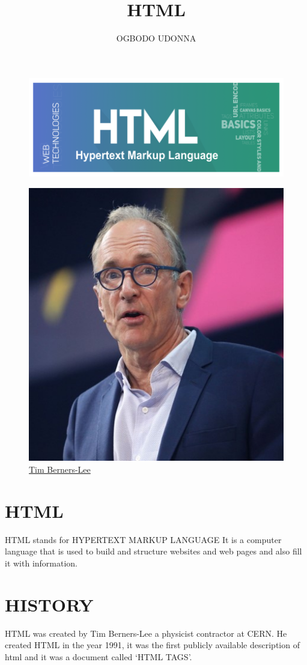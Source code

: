 \documentclass{article}
\title{HTML}
\author{OGBODO UDONNA}
\begin{document}
	\begin{figure}
		\includegraphics{"HTML"}
	\end{figure}
\begin{figure}
	\includegraphics{"TIM"}
	\caption{ \underline{Tim Berners-Lee}}
\end{figure}
\section{HTML}
HTML stands for HYPERTEXT MARKUP LANGUAGE
It is a computer language that is used to build and structure websites and web pages and also fill it with information.

\section{HISTORY}
HTML was created by Tim Berners-Lee a physicist contractor at CERN. He created HTML in the year 1991, it was the first publicly available description of html and it was a document called ‘HTML TAGS’. 
\end{document}
